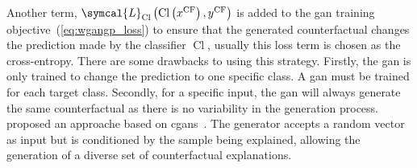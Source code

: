 \documentclass[../main.tex]{subfiles}
\begin{document}
	Another term, \(\symcal{L}_{\operatorname{Cl}}\left(\operatorname{Cl}\left(x^{\text{CF}}\right), y^{\text{CF}}\right)\) is added to the \gls{gan} training objective~(\cref{eq:wgangp_loss}) to ensure that the generated counterfactual changes the prediction made by the classifier \(\operatorname{Cl}\), usually this loss term is chosen as the cross-entropy.
	There are some drawbacks to using this strategy.
	Firstly, the \gls{gan} is only trained to change the prediction to one specific class.
	A \gls{gan} must be trained for each target class.
	Secondly, for a specific input, the \gls{gan} will always generate the same counterfactual as there is no variability in the generation process.
	\citeauthor{Yang2021ModelBasedCS} proposed an approache based on \glspl{cgan}~\cite{Yang2021ModelBasedCS}.
	The generator accepts a random vector as input but is conditioned by the sample being explained, allowing the generation of a diverse set of counterfactual explanations.
\end{document}
